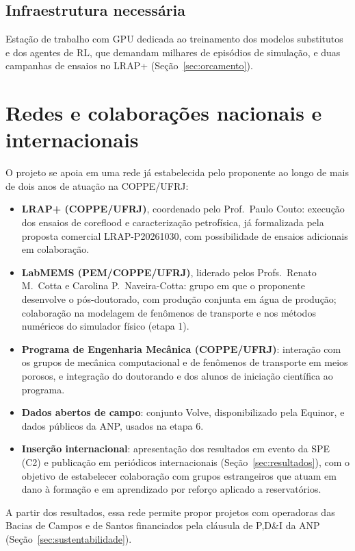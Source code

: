\documentclass[10pt,a4paper]{article}
\newcommand{\itemedital}[1]{}
\begin{document}
\subsection{Infraestrutura necessária}
Estação de trabalho com GPU dedicada ao treinamento dos modelos
substitutos e dos agentes de RL, que demandam milhares de episódios de simulação, e
duas campanhas de ensaios no LRAP+ (Seção~\ref{sec:orcamento}).

\section{Redes e colaborações nacionais e internacionais}\itemedital{2.16 XX}
O projeto se apoia em uma rede já estabelecida pelo proponente ao longo de mais de dois anos
de atuação na COPPE/UFRJ:
\begin{itemize}
  \item \textbf{LRAP+ (COPPE/UFRJ)}, coordenado pelo Prof.\ Paulo Couto: execução dos
        ensaios de coreflood e caracterização petrofísica, já formalizada pela proposta
        comercial LRAP-P20261030, com possibilidade de ensaios adicionais em colaboração.
  \item \textbf{LabMEMS (PEM/COPPE/UFRJ)}, liderado pelos Profs.\ Renato M.\ Cotta e
        Carolina P.\ Naveira-Cotta: grupo em que o proponente desenvolve o pós-doutorado,
        com produção conjunta em água de produção; colaboração na modelagem de fenômenos de
        transporte e nos métodos numéricos do simulador físico (etapa 1).
  \item \textbf{Programa de Engenharia Mecânica (COPPE/UFRJ)}: interação com os grupos de
        mecânica computacional e de fenômenos de transporte em meios porosos, e integração
        do doutorando e dos alunos de iniciação científica ao programa.
  \item \textbf{Dados abertos de campo}: conjunto Volve, disponibilizado pela Equinor, e dados
        públicos da ANP, usados na etapa 6.
  \item \textbf{Inserção internacional}: apresentação dos resultados em evento da SPE (C2) e
        publicação em periódicos internacionais (Seção~\ref{sec:resultados}), com o objetivo de
        estabelecer colaboração com grupos estrangeiros que atuam em dano à formação e em
        aprendizado por reforço aplicado a reservatórios.
\end{itemize}
A partir dos resultados, essa rede permite propor projetos com operadoras das Bacias de
Campos e de Santos financiados pela cláusula de P,D\&I da ANP (Seção~\ref{sec:sustentabilidade}).
\end{document}
